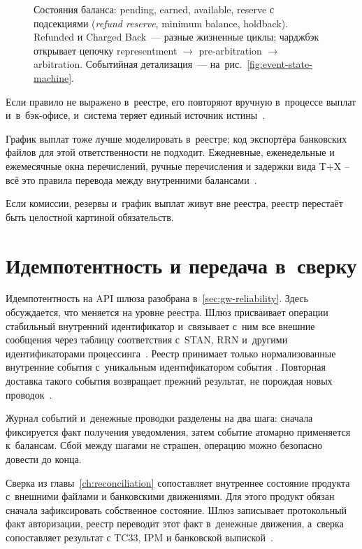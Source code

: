 \begin{figure}[tbp]
  \centering
  \caption{Состояния баланса: pending, earned, available, reserve
    с подсекциями (\textit{refund reserve}, minimum balance,
    holdback). Refunded и Charged Back~--- разные жизненные циклы;
    чарджбэк открывает цепочку representment $\to$ pre-arbitration
    $\to$ arbitration. Событийная детализация~---
    на~рис.~\ref{fig:event-state-machine}.}\label{fig:balance-states}
\end{figure}

Если правило не выражено в~реестре, его повторяют вручную
в~процессе выплат и~в~бэк-офисе, и~система теряет единый источник
истины~\cite{stripe-minimum-balances,adyen-balances}.

График выплат тоже лучше моделировать в~реестре; код экспортёра
банковских файлов для этой ответственности не подходит. Ежедневные, еженедельные
и ежемесячные окна перечислений, ручные перечисления и задержки вида T+X --
всё это правила перевода между внутренними балансами~\cite{stripe-payouts}.

Если комиссии, резервы и~график выплат живут вне реестра, реестр
перестаёт быть целостной картиной обязательств.

\section{Идемпотентность и передача в~сверку}\label{sec:ledger-idempotency}

Идемпотентность на API шлюза разобрана в~\ref{sec:gw-reliability}.
Здесь обсуждается, что меняется на уровне реестра. Шлюз присваивает
операции стабильный внутренний идентификатор и~связывает с~ним все
внешние сообщения через таблицу соответствия с~STAN, RRN
и~другими идентификаторами процессинга~\cite{fis-iso8583-guide-2023}. Реестр
принимает только нормализованные внутренние события с~уникальным
идентификатором события . Повторная доставка такого события возвращает
прежний результат, не порождая новых проводок~\cite{stripe-webhooks}.

Журнал событий и~денежные проводки разделены на два шага: сначала
фиксируется факт получения уведомления, затем событие атомарно применяется
к~балансам. Сбой между шагами не страшен, операцию можно
безопасно довести до конца.

Сверка из главы~\ref{ch:reconciliation} сопоставляет внутреннее
состояние продукта с~внешними файлами и банковскими движениями.
Для этого продукт обязан сначала зафиксировать собственное состояние.
Шлюз записывает протокольный факт авторизации, реестр переводит этот факт
в~денежные движения, а~сверка сопоставляет результат с TC33, IPM
и банковской выпиской~\cite{visa-core-rules,mc-tpr,mc-switching-services}.

